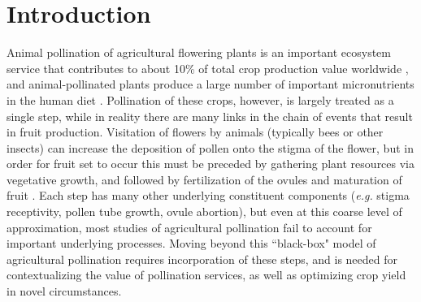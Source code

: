 \documentclass[12pt]{article} %
\begin{document}
\section*{Introduction}
Animal pollination of agricultural flowering plants is an important ecosystem service that contributes to about 10\% of total crop production value worldwide \citep{gallai2009}, and animal-pollinated plants produce a large number of important micronutrients in the human diet \citep{eilers2011}.
Pollination of these crops, however, is largely treated as a single step, while in reality there are many links in the chain of events that result in fruit production.
Visitation of flowers by animals (typically bees or other insects) can increase the deposition of pollen onto the stigma of the flower, but in order for fruit set to occur this must be preceded by gathering plant resources via vegetative growth, and followed by fertilization of the ovules and maturation of fruit \citep{erbar2003, goldberg1994}.
Each step has many other underlying constituent components (\textit{e.g.} stigma receptivity, pollen tube growth, ovule abortion), but even at this coarse level of approximation, most studies of agricultural pollination fail to account for important underlying processes.
Moving beyond this ``black-box" model of agricultural pollination requires incorporation of these steps, and is needed for contextualizing the value of pollination services, as well as optimizing crop yield in novel circumstances.



\end{document}
